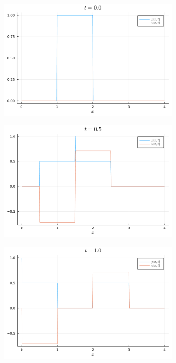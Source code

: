 \documentclass{article}
\begin{document}
\begin{figure}[H]
	\centering
	\begin{subfigure}{0.495\linewidth}
		\centering
		\includegraphics[width=\linewidth]{prob3-5-1.pdf}
	\end{subfigure}
	\begin{subfigure}{0.495\linewidth}
		\centering
		\includegraphics[width=\linewidth]{prob3-5-2.pdf}
	\end{subfigure}
	\begin{subfigure}{0.495\linewidth}
		\centering
		\includegraphics[width=\linewidth]{prob3-5-3.pdf}

\end{subfigure}
\end{figure}
\end{document}
